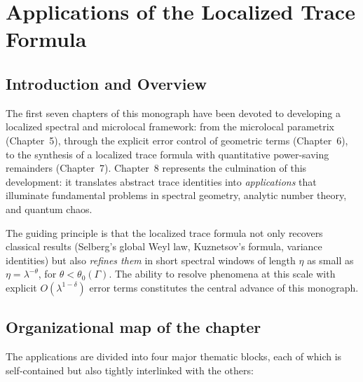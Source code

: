 
\chapter{Applications of the Localized Trace Formula}\label{ch:applications}

\section{Introduction and Overview}

The first seven chapters of this monograph have been devoted to developing a localized spectral and microlocal framework: from the microlocal parametrix (Chapter~5), through the explicit error control of geometric terms (Chapter~6), to the synthesis of a localized trace formula with quantitative power-saving remainders (Chapter~7). Chapter~8 represents the culmination of this development: it translates abstract trace identities into \emph{applications} that illuminate fundamental problems in spectral geometry, analytic number theory, and quantum chaos.

The guiding principle is that the localized trace formula not only recovers classical results (Selberg’s global Weyl law, Kuznetsov’s formula, variance identities) but also \emph{refines them} in short spectral windows of length $\eta$ as small as $\eta=\lambda^{-\theta}$, for $\theta<\theta_0(\Gamma)$. The ability to resolve phenomena at this scale with explicit $O(\lambda^{1-\delta})$ error terms constitutes the central advance of this monograph.

\section{Organizational map of the chapter}

The applications are divided into four major thematic blocks, each of which is self-contained but also tightly interlinked with the others:


